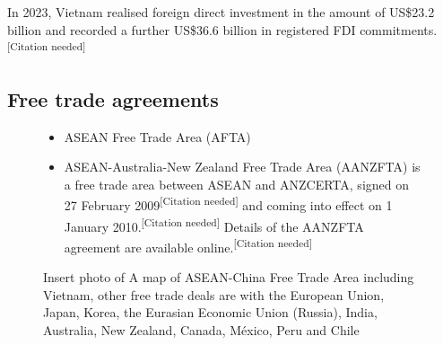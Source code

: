 \documentclass{article}
\begin{document}
In 2023, Vietnam realised foreign direct investment in the amount of US\$23.2 billion and recorded a further US\$36.6 billion in registered FDI commitme\-nts.\textsuperscript{[Citation needed]}

\clearpage
\subsection*{Free trade agreements}

    \begin{figure}[ht!] 
        \begin{minipage}{0.49\textwidth}
            \centering
            \begin{itemize} 
                \item ASEAN Free Trade Area (AFTA)
                \item ASEAN-Australia-New Zealand Free Trade Area (AANZFTA) is a free trade area between ASEAN and ANZCERTA, signed on 27 February 2009\textsuperscript{[Citation needed]} and coming into effect on 1 January 2010.\textsuperscript{[Citation needed]} Details of the AANZFTA agreement are available online.\textsuperscript{[Citation needed]}
                \end{itemize}
        \end{minipage}
        \hfill 
        \begin{minipage}{0.48\textwidth}
            
            Insert photo of A map of ASEAN-China Free Trade Area including Vietnam, other free trade deals are with the European Union, Japan, Korea, the Eurasian Economic Union (Russia), India, Australia, New Zealand, Canada, México, Peru and Chile
        \end{minipage}
    \end{figure}
\end{document}
